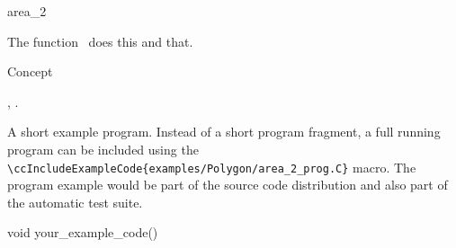 

\begin{ccRefFunction}{area_2}  %


\ccDefinition
  
The function \ccRefName\ does this and that.



\ccIsModel

Concept

\ccSeeAlso

,
.

\ccExample

A short example program.
Instead of a short program fragment, a full running program can be
included using the 
\verb|\ccIncludeExampleCode{examples/Polygon/area_2_prog.C}| 
macro. The program example would be part of the source code distribution and
also part of the automatic test suite.

\begin{ccExampleCode}
void your_example_code() {
}
\end{ccExampleCode}


\end{ccRefFunction}


